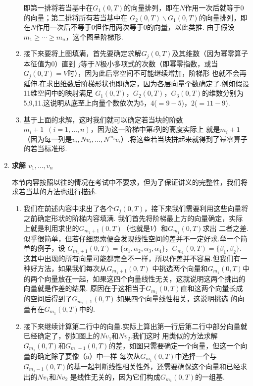 \begin{enumerate}
\begin{enumerate}
        即第一排将若当基中在$G_1(0,T)$的向量排列，即在$N$作用一次后就等于0的向量；第二排将所有若当基中在
        $G_2(0,T)\backslash G_1(0,T)$的向量排列，即在$N$作用一次后不等于0但作用两次等于0的向量，以此类推.
        由于假设$m_1\geqslant\cdots\geqslant m_n$，这个图呈阶梯形.
        \item 接下来要将上图填满，首先要确定求解$G_j(0,T)$及其维数（因为幂零算子本征值为0）直到
        $j$等于$N$极小多项式的次数（即幂零指数，或当$G_j(0,T)=V$时），因为此后零空间不可能继续增加，阶梯形
        也就不会再延伸.在求出维数后阶梯形状也即确定，因为各层向量个数确定了.例如假设11维空间中的映射满足
        $G_1(0,T)$，$G_2(0,T)$，$G_3(0,T)$的维数分别为5,9,11.这说明从底至上向量个数依次为5，4($=9-5$)，2($=11-9$).
        \item 基于上面的求解，这时我们就可以确定若当块的阶数$m_i+1\enspace(i=1,\ldots,n)$，因为这一阶梯中第$i$列的高度实际上
        就是$m_i+1$（因为每一列是$v_i,Nv_i,\ldots,N^{m_i}v_i$）.将这些若当块拼起来就得到了幂零算子的若当标准形.
    \end{enumerate}
    \item \textbf{\heiti 求解 $v_1,\ldots,v_n$}

    本节内容按照以往的情况在考试中不要求，但为了保证讲义的完整性，我们将求若当基的方法也进行描述.
    \begin{enumerate}[label=(\arabic*)]
        \item 我们在前述内容中求出了各个$G_j(0,T)$，接下来我们需要利用这些向量将之前确定形状的阶梯内容填满.
        我们首先将阶梯最上方的向量确定，实际上就是利用求出的$G_{m_1+1}(0,T)$（也就是$V$）和$G_{m_1}(0,T)$求出
        二者之差.似乎很简单，但若仔细思索便会发现线性空间的差并不一定好求.举一个简单的例子，设
        $G_{m_1+1}(0,T)=\{\alpha_1,\alpha_2,\alpha_3,\alpha_4\}$，$G_{m_1}(0,T)=\{\beta_1,\beta_2\}$.
        这其中出现的所有向量可能都完全不一样，所以作差并不容易.但我们有一种好方法，如果我们每次从$G_{m_1+1}(0,T)$
        中挑选两个向量和$G_{m_1}(0,T)$中的两个向量放在一起，如果这四个向量线性无关，这就说明这两个挑出的向量就是作差的结果.
        原因在于这相当于$G_{m_1}(0,T)$直和这两个向量长成的空间后得到了$G_{m_1+1}(0,T)$.如果四个向量线性相关，这说明挑选
        的向量有在$G_{m_1}(0,T)$中的.
        \item 接下来继续计算第二行中的向量.实际上算出第一行后第二行中部分向量就已经确定了，例如图上的$Nv_1$和$Nv_2$.我们这时
        用类似的方法求解$G_{m_1}(0,T)$和$G_{m_1-1}(0,T)$的差，如图只需要确定一个向量，但这一个向量的确定除了要像（a）中一样
        每次从$G_{m_1}(0,T)$中选择一个与$G_{m_1-1}(0,T)$的基一起判断线性相关性外，还需要确保这个向量和已经求出的$Nv_1$和$Nv_2$
        是线性无关的，因为它们构成$G_{m_1}(0,T)$的一组基.


\end{enumerate}
\end{enumerate}
